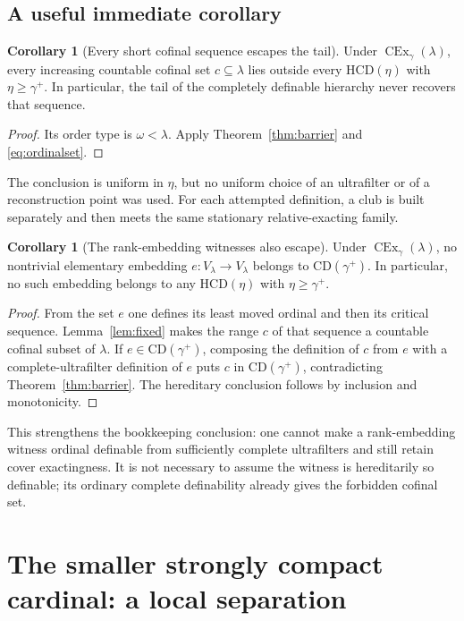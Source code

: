 \documentclass[11pt,letterpaper]{article}
\theoremstyle{definition}
\newtheorem{corollary}[definition]{Corollary}
\newcommand{\CEx}{\operatorname{CEx}}
\newcommand{\CD}{\mathrm{CD}}
\newcommand{\HCD}{\mathrm{HCD}}
\begin{document}
\subsection{A useful immediate corollary}

\begin{corollary}[Every short cofinal sequence escapes the tail]\label{cor:tail}
Under $\CEx_\gamma(\lambda)$, every increasing countable cofinal set $c\subseteq\lambda$ lies outside every $\HCD(\eta)$ with $\eta\geq\gamma^+$. In particular, the tail of the completely definable hierarchy never recovers that sequence.
\end{corollary}

\begin{proof}
Its order type is $\omega<\lambda$. Apply Theorem~\ref{thm:barrier} and \eqref{eq:ordinalset}.
\end{proof}

The conclusion is uniform in $\eta$, but no uniform choice of an ultrafilter or of a reconstruction point was used. For each attempted definition, a club is built separately and then meets the same stationary relative-exacting family.


\begin{corollary}[The rank-embedding witnesses also escape]\label{cor:embeddingescape}
Under $\CEx_\gamma(\lambda)$, no nontrivial elementary embedding $e:V_\lambda\to V_\lambda$ belongs to $\CD(\gamma^+)$. In particular, no such embedding belongs to any $\HCD(\eta)$ with $\eta\geq\gamma^+$.
\end{corollary}

\begin{proof}
From the set $e$ one defines its least moved ordinal and then its critical sequence. Lemma~\ref{lem:fixed} makes the range $c$ of that sequence a countable cofinal subset of $\lambda$. If $e\in\CD(\gamma^+)$, composing the definition of $c$ from $e$ with a complete-ultrafilter definition of $e$ puts $c$ in $\CD(\gamma^+)$, contradicting Theorem~\ref{thm:barrier}. The hereditary conclusion follows by inclusion and monotonicity.
\end{proof}

This strengthens the bookkeeping conclusion: one cannot make a rank-embedding witness ordinal definable from sufficiently complete ultrafilters and still retain cover exactingness. It is not necessary to assume the witness is hereditarily so definable; its ordinary complete definability already gives the forbidden cofinal set.

\section{The smaller strongly compact cardinal: a local separation}\label{sec:below}
\end{document}
